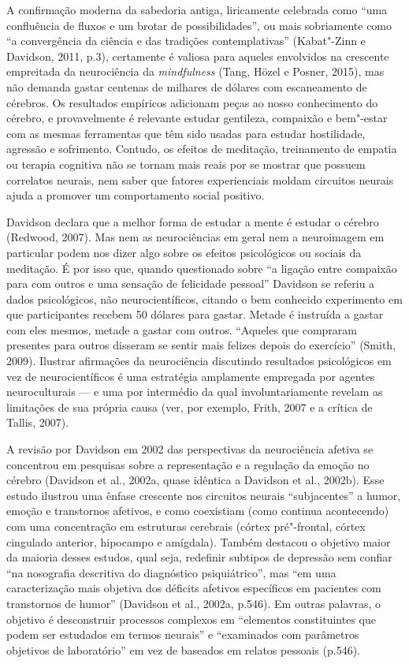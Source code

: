 A confirmação moderna da sabedoria antiga, liricamente celebrada como
``uma confluência de fluxos e um brotar de possibilidades'', ou mais
sobriamente como ``a convergência da ciência e das tradições
contemplativas'' (Kabat"-Zinn e Davidson, 2011, p.3), certamente é
valiosa para aqueles envolvidos na crescente empreitada da neurociência
da \emph{mindfulness} (Tang, Hözel e Posner, 2015), mas não demanda
gastar centenas de milhares de dólares com escaneamento de cérebros. Os
resultados empíricos adicionam peças ao nosso conhecimento do cérebro, e
provavelmente é relevante estudar gentileza, compaixão e bem"-estar com
as mesmas ferramentas que têm sido usadas para estudar hostilidade,
agressão e sofrimento. Contudo, os efeitos de meditação, treinamento de
empatia ou terapia cognitiva não se tornam mais reais por se mostrar que
possuem correlatos neurais, nem saber que fatores experienciais moldam
circuitos neurais ajuda a promover um comportamento social positivo.

Davidson declara que a melhor forma de estudar a mente é estudar o
cérebro (Redwood, 2007). Mas nem as neurociências em geral nem a
neuroimagem em particular podem nos dizer algo sobre os efeitos
psicológicos ou sociais da meditação. É por isso que, quando questionado
sobre ``a ligação entre compaixão para com outros e uma sensação de
felicidade pessoal'' Davidson se referiu a dados psicológicos, não
neurocientíficos, citando o bem conhecido experimento em que
participantes recebem 50 dólares para gastar. Metade é instruída a
gastar com eles mesmos, metade a gastar com outros. ``Aqueles que
compraram presentes para outros disseram se sentir mais felizes depois
do exercício'' (Smith, 2009). Ilustrar afirmações da neurociência
discutindo resultados psicológicos em vez de neurocientíficos é uma
estratégia amplamente empregada por agentes neuroculturais --- e uma por
intermédio da qual involuntariamente revelam as limitações de sua
própria causa (ver, por exemplo, Frith, 2007 e a crítica de Tallis,
2007).

A revisão por Davidson em 2002 das perspectivas da neurociência afetiva
se concentrou em pesquisas sobre a representação e a regulação da emoção
no cérebro (Davidson et al., 2002a, quase idêntica a Davidson et al.,
2002b). Esse estudo ilustrou uma ênfase crescente nos circuitos neurais
``subjacentes'' a humor, emoção e transtornos afetivos, e como
coexistiam (como continua acontecendo) com uma concentração em
estruturas cerebrais (córtex pré"-frontal, córtex cingulado anterior,
hipocampo e amígdala). Também destacou o objetivo maior da maioria
desses estudos, qual seja, redefinir subtipos de depressão sem confiar
``na nosografia descritiva do diagnóstico psiquiátrico'', mas ``em uma
caracterização mais objetiva dos déficits afetivos específicos em
pacientes com transtornos de humor'' (Davidson et al., 2002a, p.546). Em
outras palavras, o objetivo é desconstruir processos complexos em
``elementos constituintes que podem ser estudados em termos neurais'' e
``examinados com parâmetros objetivos de laboratório'' em vez de
baseados em relatos pessoais (p.546).

